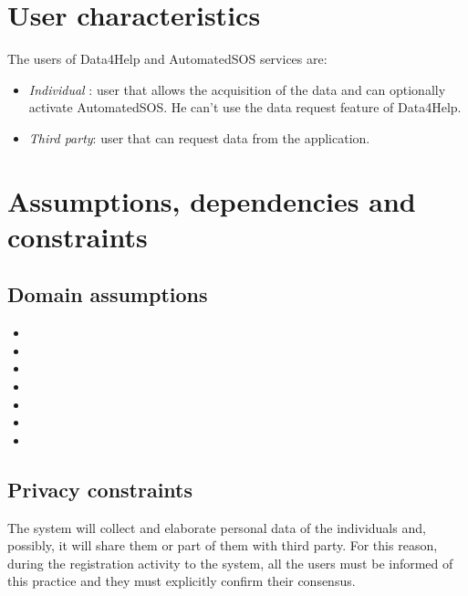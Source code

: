 \section{User characteristics}
The users of Data4Help and AutomatedSOS services are:

\begin{itemize}
\item \textit{Individual} : user that allows the acquisition of the data and can optionally activate AutomatedSOS. He can't use the data request feature of Data4Help.
\item \textit{Third party}: user that can request data from the application.
\end{itemize}





\section{Assumptions, dependencies and constraints}

\subsection{Domain assumptions}

\begin{itemize}


\item[]  
\item[]
\item[]
\item[]
\item[]
\item[]
\item[]
\end{itemize}




\subsection{Privacy constraints}
The system will collect and elaborate personal data of the individuals and, possibly, it will share them or part of them with third party.  For this reason, during the registration activity to the system, all the users must be informed of this practice and they must explicitly confirm their consensus.

